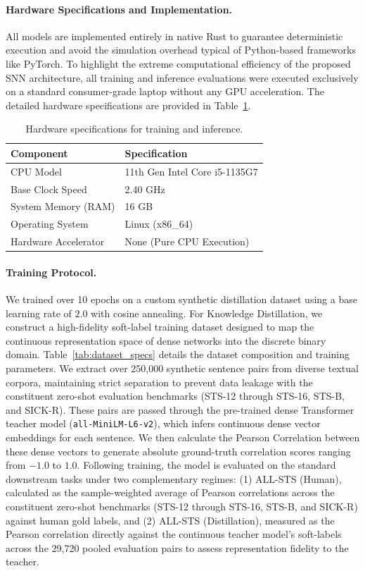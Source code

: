 \documentclass[runningheads]{llncs}
\begin{document}
\paragraph{Hardware Specifications and Implementation.} All models are implemented entirely in native Rust to guarantee deterministic execution and avoid the simulation overhead typical of Python-based frameworks like PyTorch. To highlight the extreme computational efficiency of the proposed SNN architecture, all training and inference evaluations were executed exclusively on a standard consumer-grade laptop without any GPU acceleration. The detailed hardware specifications are provided in Table~\ref{tab:hardware_specs}.

\begin{table}[t]
\caption{Hardware specifications for training and inference.}\label{tab:hardware_specs}
\centering
\begin{tabular}{ll}
\toprule
\textbf{Component} & \textbf{Specification} \\
\midrule
CPU Model & 11th Gen Intel Core i5-1135G7 \\
Base Clock Speed & 2.40 GHz \\
System Memory (RAM) & 16 GB \\
Operating System & Linux (x86\_64) \\
Hardware Accelerator & None (Pure CPU Execution) \\
\bottomrule
\end{tabular}
\end{table}

\paragraph{Training Protocol.} We trained over 10 epochs on a custom synthetic distillation dataset using a base learning rate of $2.0$ with cosine annealing. For Knowledge Distillation, we construct a high-fidelity soft-label training dataset designed to map the continuous representation space of dense networks into the discrete binary domain. Table~\ref{tab:dataset_specs} details the dataset composition and training parameters. We extract over 250,000 synthetic sentence pairs from diverse textual corpora, maintaining strict separation to prevent data leakage with the constituent zero-shot evaluation benchmarks (STS-12 through STS-16, STS-B, and SICK-R). These pairs are passed through the pre-trained dense Transformer teacher model (\texttt{all-MiniLM-L6-v2}), which infers continuous dense vector embeddings for each sentence. We then calculate the Pearson Correlation between these dense vectors to generate absolute ground-truth correlation scores ranging from $-1.0$ to $1.0$. Following training, the model is evaluated on the standard downstream tasks under two complementary regimes: (1) ALL-STS (Human), calculated as the sample-weighted average of Pearson correlations across the constituent zero-shot benchmarks (STS-12 through STS-16, STS-B, and SICK-R) against human gold labels, and (2) ALL-STS (Distillation), measured as the Pearson correlation directly against the continuous teacher model's soft-labels across the 29,720 pooled evaluation pairs to assess representation fidelity to the teacher.
\end{document}
